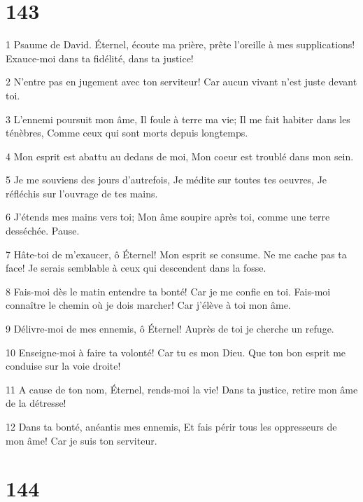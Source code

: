 \chapter{143}

\par 1 Psaume de David. Éternel, écoute ma prière, prête l'oreille à mes supplications! Exauce-moi dans ta fidélité, dans ta justice!
\par 2 N'entre pas en jugement avec ton serviteur! Car aucun vivant n'est juste devant toi.
\par 3 L'ennemi poursuit mon âme, Il foule à terre ma vie; Il me fait habiter dans les ténèbres, Comme ceux qui sont morts depuis longtemps.
\par 4 Mon esprit est abattu au dedans de moi, Mon coeur est troublé dans mon sein.
\par 5 Je me souviens des jours d'autrefois, Je médite sur toutes tes oeuvres, Je réfléchis sur l'ouvrage de tes mains.
\par 6 J'étends mes mains vers toi; Mon âme soupire après toi, comme une terre desséchée. Pause.
\par 7 Hâte-toi de m'exaucer, ô Éternel! Mon esprit se consume. Ne me cache pas ta face! Je serais semblable à ceux qui descendent dans la fosse.
\par 8 Fais-moi dès le matin entendre ta bonté! Car je me confie en toi. Fais-moi connaître le chemin où je dois marcher! Car j'élève à toi mon âme.
\par 9 Délivre-moi de mes ennemis, ô Éternel! Auprès de toi je cherche un refuge.
\par 10 Enseigne-moi à faire ta volonté! Car tu es mon Dieu. Que ton bon esprit me conduise sur la voie droite!
\par 11 A cause de ton nom, Éternel, rends-moi la vie! Dans ta justice, retire mon âme de la détresse!
\par 12 Dans ta bonté, anéantis mes ennemis, Et fais périr tous les oppresseurs de mon âme! Car je suis ton serviteur.

\chapter{144}

